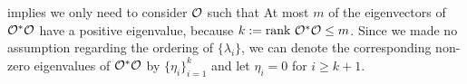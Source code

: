 
implies we only need to consider $\mathcal{O}$ such that  
At most $m$ of the eigenvectors of $\mathcal{O}^*\mathcal{O}$ have a positive
eigenvalue, because $k := \textup{rank}\  \mathcal{O}^*\mathcal{O} \leq m$. Since we made no
assumption regarding the ordering of $\{\lambda_i\}$, we can denote
the corresponding non-zero eigenvalues of $\mathcal{O}^*\mathcal{O}$ by
$\{\eta_i\}_{i=1}^{k}$ and let $\eta_i = 0$ for $i \geq k+1$.


